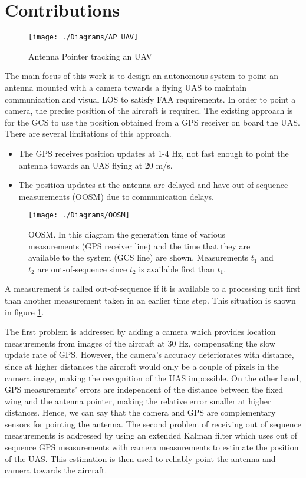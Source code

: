 \section{Contributions}
\begin{figure}[h!]
  \centering
  \texttt{[image: ./Diagrams/AP\_UAV]}
  \caption{Antenna Pointer tracking an UAV}
\end{figure}
The main focus of this work is to design an autonomous system to point an antenna mounted with a camera towards a flying UAS to maintain communication and visual LOS to satisfy FAA requirements. In order to point a camera, the precise position of the aircraft is required. The existing approach is for the GCS to use the position obtained from a GPS receiver on board the UAS. There are several limitations of this approach. 
\begin{itemize}[nosep]
\item The GPS receives position updates at 1-4 Hz, not fast enough to point the antenna towards an UAS flying at 20 m/s.
\item The position updates at the antenna are delayed and have out-of-sequence measurements (OOSM) due to communication delays.
\end{itemize}
\begin{figure}[h!]
  \centering
  \texttt{[image: ./Diagrams/OOSM]}
  \caption[Out-Of-Sequence Measurement]{OOSM. 
  In this diagram the generation time of various measurements (GPS receiver line) and the time that they are available to the system (GCS line) are shown. Measurements $t_1$ and $t_2$ are out-of-sequence since $t_2$ is available first than $t_1$.\label{fig:OOSM}}
\end{figure}
A measurement is called out-of-sequence if it is available to a processing unit first than another measurement taken in an earlier time step. This situation is shown in figure \ref{fig:OOSM}.

The first problem is addressed by adding a camera which provides location measurements from images of the aircraft at 30 Hz, compensating the slow update rate of GPS. However, the camera's accuracy deteriorates with distance, since at higher distances the aircraft would only be a couple of pixels in the camera image, making the recognition of the UAS impossible. On the other hand, GPS measurements' errors are independent of the distance between the fixed wing and the antenna pointer, making the relative error smaller at higher distances. Hence, we can say that the camera and GPS are complementary sensors for pointing the antenna. The second problem of receiving out of sequence measurements is addressed by using an extended Kalman filter which uses out of sequence GPS measurements with camera measurements to estimate the position of the UAS. This estimation is then used to reliably point the antenna and camera towards the aircraft.


